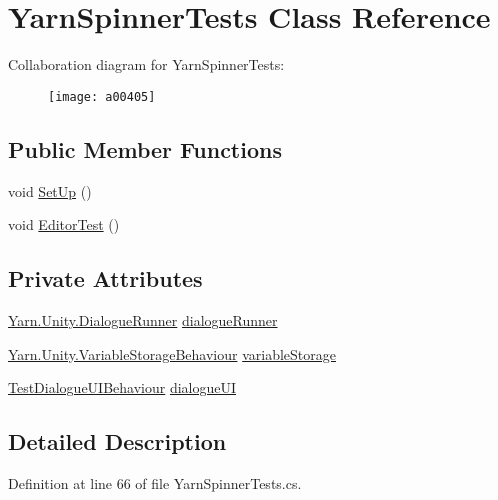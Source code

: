 \hypertarget{a00192}{\section{Yarn\-Spinner\-Tests Class Reference}
\label{a00192}
}


Collaboration diagram for Yarn\-Spinner\-Tests\-:
\nopagebreak
\begin{figure}[H]
\begin{center}
\leavevmode
\texttt{[image: a00405]}
\end{center}
\end{figure}
\subsection*{Public Member Functions}
\begin{DoxyCompactItemize}
\item 
void \hyperlink{a00192_ad6e4c6a92bb5ed6187949264df6aaf1b}{Set\-Up} ()
\item 
void \hyperlink{a00192_a60ab8ed8dc30ec30e74baa1916d47324}{Editor\-Test} ()
\end{DoxyCompactItemize}
\subsection*{Private Attributes}
\begin{DoxyCompactItemize}
\item 
\hyperlink{a00087}{Yarn.\-Unity.\-Dialogue\-Runner} \hyperlink{a00192_a9791840e0b5987e5bd09bce83ce2d8d9}{dialogue\-Runner}
\item 
\hyperlink{a00185}{Yarn.\-Unity.\-Variable\-Storage\-Behaviour} \hyperlink{a00192_a27dbc8c3f7f23ce142d1d5d1fd3df8bc}{variable\-Storage}
\item 
\hyperlink{a00165}{Test\-Dialogue\-U\-I\-Behaviour} \hyperlink{a00192_aace025d2a9a703154a1989c47b0a0737}{dialogue\-U\-I}
\end{DoxyCompactItemize}


\subsection{Detailed Description}


Definition at line 66 of file Yarn\-Spinner\-Tests.\-cs.



